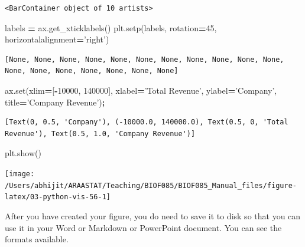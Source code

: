 \documentclass[
  letterpaper,
]{scrbook}
\newenvironment{Shaded}{\begin{snugshade}}{\end{snugshade}}
\newcommand{\BuiltInTok}[1]{#1}
\newcommand{\DecValTok}[1]{\textcolor[rgb]{0.00,0.00,0.81}{#1}}
\newcommand{\NormalTok}[1]{#1}
\newcommand{\OperatorTok}[1]{\textcolor[rgb]{0.81,0.36,0.00}{\textbf{#1}}}
\newcommand{\StringTok}[1]{\textcolor[rgb]{0.31,0.60,0.02}{#1}}
\begin{document}
\begin{verbatim}
<BarContainer object of 10 artists>
\end{verbatim}

\begin{Shaded}
\begin{Highlighting}[]
\NormalTok{labels }\OperatorTok{=}\NormalTok{ ax.get_xticklabels()}
\NormalTok{plt.setp(labels, rotation}\OperatorTok{=}\DecValTok{45}\NormalTok{, horizontalalignment}\OperatorTok{=}\StringTok{'right'}\NormalTok{)}
\end{Highlighting}
\end{Shaded}

\begin{verbatim}
[None, None, None, None, None, None, None, None, None, None, None, None, None, None, None, None, None, None]
\end{verbatim}

\begin{Shaded}
\begin{Highlighting}[]
\NormalTok{ax.}\BuiltInTok{set}\NormalTok{(xlim}\OperatorTok{=}\NormalTok{[}\OperatorTok{-}\DecValTok{10000}\NormalTok{, }\DecValTok{140000}\NormalTok{], xlabel}\OperatorTok{=}\StringTok{'Total Revenue'}\NormalTok{, ylabel}\OperatorTok{=}\StringTok{'Company'}\NormalTok{,}
\NormalTok{       title}\OperatorTok{=}\StringTok{'Company Revenue'}\NormalTok{)}\OperatorTok{;}
\end{Highlighting}
\end{Shaded}

\begin{verbatim}
[Text(0, 0.5, 'Company'), (-10000.0, 140000.0), Text(0.5, 0, 'Total Revenue'), Text(0.5, 1.0, 'Company Revenue')]
\end{verbatim}

\begin{Shaded}
\begin{Highlighting}[]
\NormalTok{plt.show()}
\end{Highlighting}
\end{Shaded}

\begin{center}\texttt{[image: /Users/abhijit/ARAASTAT/Teaching/BIOF085/BIOF085\_Manual\_files/figure-latex/03-python-vis-56-1]} \end{center}

After you have created your figure, you do need to save it to disk so that you can use it in your Word or Markdown or PowerPoint document. You can see the formats available.
\end{document}
